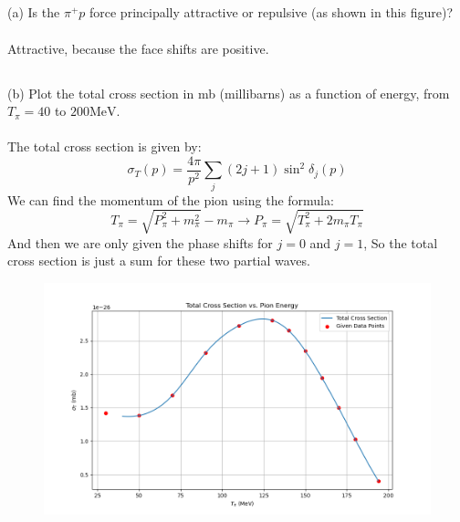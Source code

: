 \documentclass[12pt]{article}
\begin{document}
\subsection{}
(a) Is the $\pi^{+} p$ force principally attractive or repulsive (as shown in this figure)?\\\\
Attractive, because the face shifts are positive.
\subsection{}
(b) Plot the total cross section in mb (millibarns) as a function of energy, from $T_{\pi}=40$ to $200 \mathrm{MeV}$.\\\\
The total cross section is given by:
\begin{equation}
\sigma_T(p)=\frac{4 \pi}{p^2} \sum_j(2 j+1) \sin ^2 \delta_j(p)
\end{equation}
We can find the momentum of the pion using the formula:
\begin{equation}
T_{\pi}=\sqrt{P_{\pi}^{2}+m_{\pi}^{2}}-m_{\pi} \rightarrow P_{\pi}=\sqrt{T_{\pi}^{2}+2m_{\pi}T_{\pi}}
\end{equation}
And then we are only given the phase shifts for $j=0$ and $j=1$, So the total cross section is just a sum for these two partial waves. 
\begin{figure}
  \centering
  \includegraphics[max width=\textwidth]{total_cross_section.png}
\end{figure}
\end{document}
